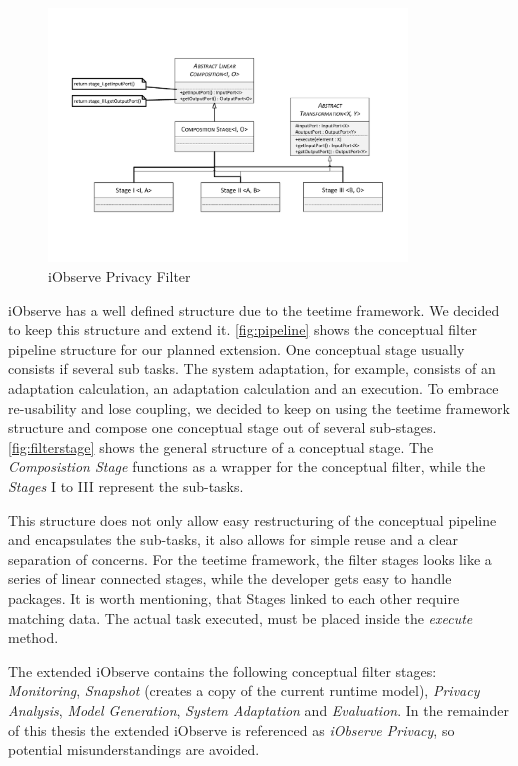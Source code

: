 \begin{figure}[h]
	\centering
	\includegraphics[trim = 20mm 40mm 20mm 35mm, clip, width=0.85\textwidth]{graphs/StageComposition}
	\caption{iObserve Privacy Filter}
	\label{fig:filterstage}
\end{figure}

iObserve has a well defined structure due to the teetime framework. We decided to keep this structure and extend it. \autoref{fig:pipeline} shows the conceptual filter pipeline structure for our planned extension. One conceptual stage usually consists if several sub tasks. The system adaptation, for example, consists of an adaptation calculation, an adaptation calculation and an execution. To embrace re-usability and lose coupling, we decided to keep on using the teetime framework structure and compose one conceptual stage out of several sub-stages. \autoref{fig:filterstage} shows the general structure of a conceptual stage. The \textit{Composistion Stage} functions as a wrapper for the conceptual filter, while the \textit{Stages} I to III represent the sub-tasks.

This structure does not only allow easy restructuring of the conceptual pipeline and encapsulates the sub-tasks, it also allows for simple reuse and a clear separation of concerns. 
For the teetime framework, the filter stages looks like a series of linear connected stages, while the developer gets easy to handle packages. It is worth mentioning, that Stages linked to each other require matching data. The actual task executed, must be placed inside the \textit{execute} method.

The extended iObserve contains the following conceptual filter stages: \textit{Monitoring}, \textit{Snapshot} (creates a copy of the current runtime model), \textit{Privacy Analysis}, \textit{Model Generation}, \textit{System Adaptation} and \textit{Evaluation}. In the remainder of this thesis the extended iObserve is referenced as \textit{iObserve Privacy}, so potential misunderstandings are avoided.



